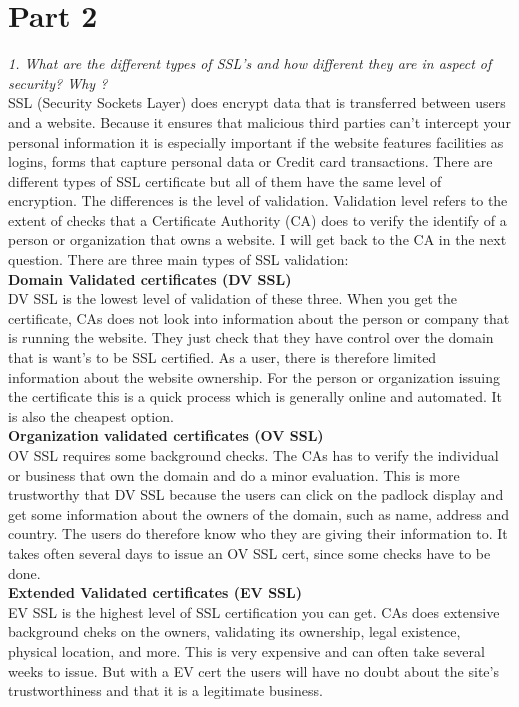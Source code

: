 \documentclass[12pt, letterpaper]{article}
\begin{document}
\section*{Part 2}
\textit{1. What are the different types of SSL's and how different they are in aspect of security? Why ?}\\
SSL (Security Sockets Layer) does encrypt data that is transferred between users and a website. Because it ensures that malicious third parties can't intercept your personal information it is especially important if the website features facilities as logins, forms that capture personal data or Credit card transactions. There are different types of SSL certificate but all of them have the same level of encryption. The differences is the level of validation. Validation level refers to the extent of checks that a Certificate Authority (CA) does to verify the identify of a person or organization that owns a website. I will get back to the CA in the next question. There are three main types of SSL validation:
\\ 
\textbf{Domain Validated certificates (DV SSL)}
\\
DV SSL is the lowest level of validation of these three. When you get the certificate, CAs does not look into information about the person or company that is running the website. They just check that they have control over the domain that is want's to be SSL certified. As a user, there is therefore limited information about the website ownership. For the person or organization issuing the certificate this is a quick process which is generally online and automated. It is also the cheapest option.
\\
\textbf{Organization validated certificates (OV SSL)}
\\
OV SSL requires some background checks. The CAs has to verify the individual or business that own the domain and do a minor evaluation. This is more trustworthy that DV SSL because the users can click on the padlock display and get some information about the owners of the domain, such as name, address and country. The users do therefore know who they are giving their information to. It takes often several days to issue an OV SSL cert, since some checks have to be done.
\\
\textbf{Extended Validated certificates (EV SSL)}
\\
EV SSL is the highest level of SSL certification you can get. CAs does extensive background cheks on the owners, validating its ownership, legal existence, physical location, and more. This is very expensive and can often take several weeks to issue. But with a EV cert the users will have no doubt about the site's trustworthiness and that it is a legitimate business.
\end{document}
